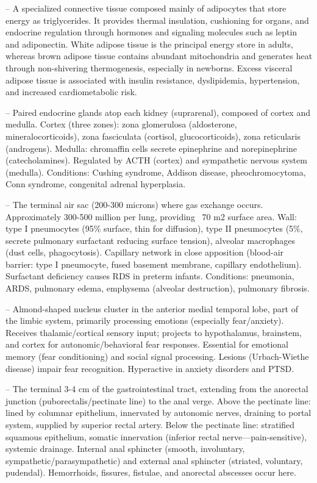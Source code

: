 -- A specialized connective tissue composed mainly of adipocytes that store energy as triglycerides. It provides thermal insulation, cushioning for organs, and endocrine regulation through hormones and signaling molecules such as leptin and adiponectin. White adipose tissue is the principal energy store in adults, whereas brown adipose tissue contains abundant mitochondria and generates heat through non-shivering thermogenesis, especially in newborns. Excess visceral adipose tissue is associated with insulin resistance, dyslipidemia, hypertension, and increased cardiometabolic risk.

-- Paired endocrine glands atop each kidney (suprarenal), composed of cortex and medulla. Cortex (three zones): zona glomerulosa (aldosterone, mineralocorticoids), zona fasciculata (cortisol, glucocorticoids), zona reticularis (androgens). Medulla: chromaffin cells secrete epinephrine and norepinephrine (catecholamines). Regulated by ACTH (cortex) and sympathetic nervous system (medulla). Conditions: Cushing syndrome, Addison disease, pheochromocytoma, Conn syndrome, congenital adrenal hyperplasia.

-- The terminal air sac (200-300 microns) where gas exchange occurs. Approximately 300-500 million per lung, providing ~70 m2 surface area. Wall: type I pneumocytes (95\% surface, thin for diffusion), type II pneumocytes (5\%, secrete pulmonary surfactant reducing surface tension), alveolar macrophages (dust cells, phagocytosis). Capillary network in close apposition (blood-air barrier: type I pneumocyte, fused basement membrane, capillary endothelium). Surfactant deficiency causes RDS in preterm infants. Conditions: pneumonia, ARDS, pulmonary edema, emphysema (alveolar destruction), pulmonary fibrosis.

-- Almond-shaped nucleus cluster in the anterior medial temporal lobe, part of the limbic system, primarily processing emotions (especially fear/anxiety). Receives thalamic/cortical sensory input; projects to hypothalamus, brainstem, and cortex for autonomic/behavioral fear responses. Essential for emotional memory (fear conditioning) and social signal processing. Lesions (Urbach-Wiethe disease) impair fear recognition. Hyperactive in anxiety disorders and PTSD.

-- The terminal 3-4 cm of the gastrointestinal tract, extending from the anorectal junction (puborectalis/pectinate line) to the anal verge. Above the pectinate line: lined by columnar epithelium, innervated by autonomic nerves, draining to portal system, supplied by superior rectal artery. Below the pectinate line: stratified squamous epithelium, somatic innervation (inferior rectal nerve—pain-sensitive), systemic drainage. Internal anal sphincter (smooth, involuntary, sympathetic/parasympathetic) and external anal sphincter (striated, voluntary, pudendal). Hemorrhoids, fissures, fistulae, and anorectal abscesses occur here.

